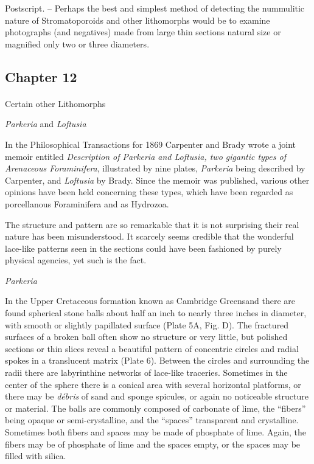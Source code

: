 \documentclass[a4paper, 12pt, oneside]{article}
\begin{document}
Postscript. -- Perhaps the best and simplest method of detecting the nummulitic nature of Stromatoporoids and other lithomorphs would be to examine photographs (and negatives) made from large thin sections natural size or magnified only two or three diameters.
\clearpage
\subsection{Chapter 12}
\paragraph{}
Certain other Lithomorphs

\emph{Parkeria} and \emph{Loftusia}

In the Philosophical Transactions for 1869 Carpenter and Brady wrote a joint memoir entitled \emph{Description of \emph{Parkeria} and \emph{Loftusia}, two gigantic types of Arenaceous Foraminifera}, illustrated by nine plates, \emph{Parkeria} being described by Carpenter, and \emph{Loftusia} by Brady. Since the memoir was published, various other opinions have been held concerning these types, which have been regarded as porcellanous Foraminifera and as Hydrozoa.

The structure and pattern are so remarkable that it is not surprising their real nature has been misunderstood. It scarcely seems credible that the wonderful lace-like patterns seen in the sections could have been fashioned by purely physical agencies, yet such is the fact.

\emph{Parkeria}

In the Upper Cretaceous formation known as Cambridge Greensand there are found spherical stone balls about half an inch to nearly three inches in diameter, with smooth or slightly papillated surface (Plate 5A, Fig. D). The fractured surfaces of a broken ball often show no structure or very little, but polished sections or thin slices reveal a beautiful pattern of concentric circles and radial spokes in a translucent matrix (Plate 6). Between the circles and surrounding the radii there are labyrinthine networks of lace-like traceries. Sometimes in the center of the sphere there is a conical area with several horizontal platforms, or there may be \emph{débris} of sand and sponge spicules, or again no noticeable structure or material. The balls are commonly composed of carbonate of lime, the ``fibers'' being opaque or semi-crystalline, and the ``spaces'' transparent and crystalline. Sometimes both fibers and spaces may be made of phosphate of lime. Again, the fibers may be of phosphate of lime and the spaces empty, or the spaces may be filled with silica.
\end{document}
